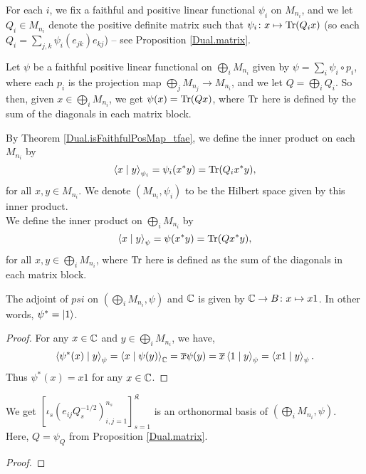\begin{definition}\label{PiMat.InnerProductSpace}
  \leanok
  For each $i$, we fix a faithful and positive linear functional $\psi_i$ on $M_{n_i}$, and we let $Q_i\in{M_{n_i}}$ denote the positive definite matrix such that $\psi_i\colon x\mapsto\operatorname{Tr}(Q_ix)$ (so each $Q_i=\sum_{j,k}\psi_i(e_{jk})e_{kj}$) -- see Proposition \ref{Dual.matrix}.

  Let $\psi$ be a faithful positive linear functional on $\bigoplus_iM_{n_i}$ given by $\psi=\sum_i\psi_i\circ p_i$, where each $p_i$ is the projection map $\bigoplus_jM_{n_j}\to M_{n_i}$, and we let $Q=\bigoplus_iQ_i$. So then, given $x\in\bigoplus_i{M_{n_i}}$, we get $\psi(x)=\operatorname{Tr}(Q x)$, where $\operatorname{Tr}$ here is defined by the sum of the diagonals in each matrix block.

  By Theorem \ref{Dual.isFaithfulPosMap_tfae}, we define the inner product on each $M_{n_i}$ by
  \[\left\langle x \mid y\right\rangle_{\psi_i}=\psi_i(x^*y)=\operatorname{Tr}(Q_ix^*y),\]
  for all $x,y\in{M_{n_i}}$. We denote $(M_{n_i},\psi_i)$ to be the Hilbert space given by this inner product.\\
  We define the inner product on $\bigoplus_iM_{n_i}$ by \[\left\langle x \mid y\right\rangle_{\psi}=\psi(x^*y)=\operatorname{Tr}(Q x^*y),\] for all $x,y\in\bigoplus_i{M_{n_i}}$, where $\operatorname{Tr}$ here is defined as the sum of the diagonals in each matrix block.
 \end{definition}

 \begin{proposition}\label{Dual.IsFaithfulPosMap.adjoint_eq_unit}
  \leanok
  The adjoint of $psi$ on $(\bigoplus_iM_{n_i},\psi)$ and $\mathbb{C}$ is given by $\mathbb{C}\to{B}\colon{x\mapsto{x1}}$. In other words, $\psi^*=\left\lvert1\right\rangle$.
 \end{proposition}
 \begin{proof}\leanok
  For any $x\in\mathbb{C}$ and $y\in\bigoplus_i{M_{n_i}}$, we have,
  \[\left\langle\psi^*(x) \mid y\right\rangle_{\psi}=\left\langle x \mid \psi(y)\right\rangle_{\mathbb{C}}=\overline{x}\psi(y)=\overline{x}\left\langle1 \mid y\right\rangle_{\psi}=\left\langle x1 \mid y\right\rangle_{\psi}.\]
  Thus $\psi^*(x)=x1$ for any $x\in\mathbb{C}$.
 \end{proof}

 \begin{proposition}\label{PiMat.onb}
  \leanok
  We get $\left[\iota_s(e_{ij}Q_s^{-1/2})_{i,j=1}^{n_s}\right]_{s=1}^{\mathfrak{K}}$ is an orthonormal basis of $(\bigoplus_iM_{n_i},\psi)$.\\
  Here, $Q=\psi_Q$ from Proposition \ref{Dual.matrix}.
 \end{proposition}
 \begin{proof}
 \end{proof}

